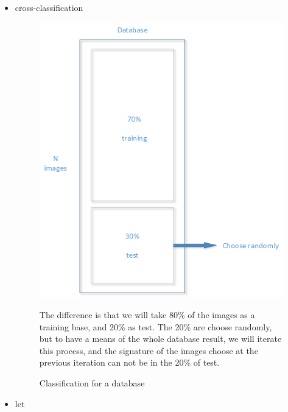 \documentclass[12pt]{article}
\begin{document}
\begin{itemize}
\item cross-classification 

\begin{figure}[h]
    \begin{minipage}{0.50\linewidth}
        \includegraphics[scale=0.7]{proced2.png}
        \caption{Classification for a database}\label{fig:proced2}
    \end{minipage}\hfill
    \begin{minipage}{0.55\linewidth}
        The difference is that we will take 80\% of the images as a training base, and 20\% as test. The 20\% are choose randomly, but to have a means of the whole database result, we will iterate this process, and the signature of the images choose at the previous iteration can not be in the 20\% of test.
    \end{minipage}
\end{figure}

\newpage
\item let


\end{itemize}
\end{document}
